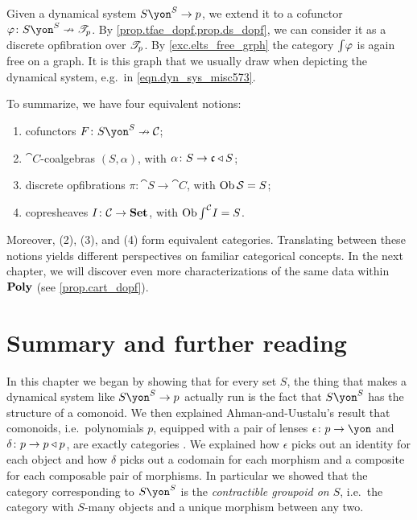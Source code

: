 \documentclass[Book-Poly]{subfiles}
\begin{document}
Given a dynamical system $S\yon^S\to p$, we extend it to a cofunctor $\varphi\colon S\yon^S\cof\cofree{p}$. By \cref{prop.tfae_dopf,prop.ds_dopf}, we can consider it as a discrete opfibration over $\mathscr{T}_{p}$. By \cref{exc.elts_free_grph} the category $\textstyle{\int} \varphi$ is again free on a graph. It is this graph that we usually draw when depicting the dynamical system, e.g.\ in \eqref{eqn.dyn_sys_misc573}.




To summarize, we have four equivalent notions:
\begin{enumerate}[label=(\arabic*)]
    \item cofunctors $F\colon S\yon^S\cof\cat{C}$;
    \item $\cat{C}$-coalgebras $(S,\alpha)$, with $\alpha\colon S\to\mathfrak{c}\mathbin{\triangleleft} S$;
    \item discrete opfibrations $\pi\colon \cat{S}\to\cat{C}$, with $\operatorname{Ob}\mathcal{S}=S$;
    \item copresheaves $I\colon\mathcal{C}\to\mathbf{Set}$, with $\operatorname{Ob}\textstyle{\int}^{\mathcal{C}}I=S$.
\end{enumerate}
Moreover, (2), (3), and (4) form equivalent categories.
Translating between these notions yields different perspectives on familiar categorical concepts.
In the next chapter, we will discover even more characterizations of the same data within $\mathbf{Poly}$ (see \cref{prop.cart_dopf}).

\section{Summary and further reading}

In this chapter we began by showing that for every set $S$, the thing that makes a dynamical system like $S\yon^S\to p$ actually run is the fact that $S\yon^S$ has the structure of a comonoid.  We then explained Ahman-and-Uustalu's result that comonoids, i.e.\ polynomials $p$, equipped with a pair of lenses $\epsilon\colon p\to\yon$ and $\delta\colon p\to p\mathbin{\triangleleft} p$, are exactly categories \cite{ahman2016directed}. We explained how $\epsilon$ picks out an identity for each object and how $\delta$ picks out a codomain for each morphism and a composite for each composable pair of morphisms. In particular we showed that the category corresponding to $S\yon^S$ is the \emph{contractible groupoid on $S$}, i.e.\ the category with $S$-many objects and a unique morphism between any two.
\end{document}
